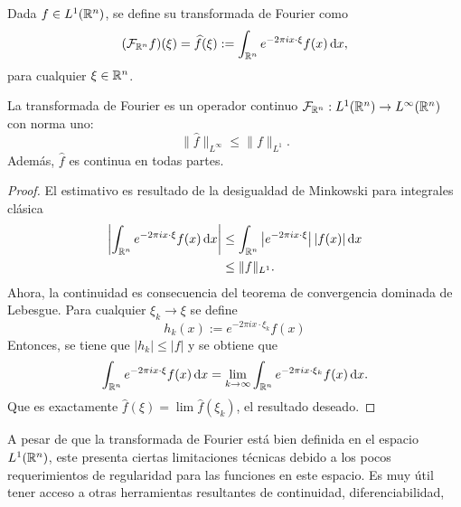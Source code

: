 \begin{definition}
    Dada $f\in L^1(\mathbb{R}^n)$, se define su transformada de Fourier como 
    \begin{equation*}
        (\mathcal{F}_{\mathbb{R}^n}f)(\xi) = \widehat{f}(\xi) := \int_{\mathbb{R}^n}
        e^{-2\pi i x \cdot \xi} f(x) \mathop{}\!\mathrm{d} x,
    \end{equation*}
    para cualquier $\xi \in \mathbb{R}^n$.
\end{definition}

\begin{proposition}
    La transformada de Fourier es un operador continuo 
    $\mathcal{F}_{\mathbb{R}^n} : L^1(\mathbb{R}^n) \rightarrow L^\infty(\mathbb{R}^n)$ con norma uno:
    \begin{equation*}
        \|\widehat{f}\|_{L^\infty} \leq \|f\|_{L^1}.
    \end{equation*}
    Además, $\widehat{f}$ es continua en todas partes. 
\end{proposition}
\begin{proof}
    El estimativo es resultado de la desigualdad de Minkowski para integrales
    clásica 
    \begin{align*}
        \left|
            \int_{\mathbb{R}^n} e^{-2\pi i x \cdot \xi} f(x) \mathop{}\!\mathrm{d} x
        \right| & \leq 
        \int_{\mathbb{R}^n} \left|e^{-2\pi i x \cdot \xi}\right|| f(x)| \mathop{}\!\mathrm{d} x\\
        & \leq \|f\|_{L^1}.
    \end{align*}
    Ahora, la continuidad es consecuencia del teorema de convergencia dominada
    de Lebesgue. Para cualquier $\xi_k \rightarrow \xi$ se define 
    \begin{equation*}
        h_k(x) :=  e^{-2\pi i x \cdot \xi_k} f(x)
    \end{equation*}
    Entonces, se tiene que $|h_k| \leq |f|$ y se obtiene que 
    \begin{equation*}
        \int_{\mathbb{R}^n} e^{-2\pi i x \cdot \xi} f(x) \mathop{}\!\mathrm{d} x = 
        \lim_{k\rightarrow\infty}\int_{\mathbb{R}^n} e^{-2\pi i x \cdot \xi_k} f(x) \mathop{}\!\mathrm{d} x.
    \end{equation*} 
    Que es exactamente $\widehat{f}(\xi) = \lim \widehat{f}(\xi_k)$, el 
    resultado deseado.
\end{proof}
A pesar de que la transformada de Fourier está bien definida en el espacio
$L^1(\mathbb{R}^n)$, este presenta ciertas limitaciones técnicas debido a los pocos
requerimientos de regularidad para las funciones en este espacio. Es muy útil
tener acceso a otras herramientas resultantes de continuidad, diferenciabilidad,
